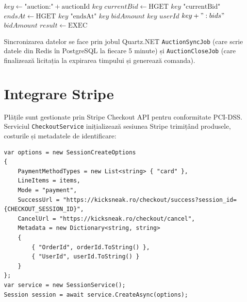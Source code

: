\begin{algorithm}[htbp]
\DontPrintSemicolon
\SetAlgoLined
{}
\BlankLine
$key \leftarrow \text{"auction:"} + \text{auctionId}$\;
 $key$\;
$currentBid \leftarrow \text{HGET } key \text{ "currentBid"}$\;
$endsAt \leftarrow \text{HGET } key \text{ "endsAt"}$\;
\;
 $key$  $bidAmount$\;
 $key$  $userId$\;
 $key + ":bids"$ $bidAmount$\;
$result \leftarrow \text{EXEC}$\;
  \;
\;
\;
\caption{Algoritmul de plasare bid cu control optimist al concurenței în Redis}
\label{alg:place_bid}
\end{algorithm}

Sincronizarea datelor se face prin jobul Quartz.NET \texttt{AuctionSyncJob} (care scrie datele din Redis în PostgreSQL la fiecare 5 minute) și \texttt{AuctionCloseJob} (care finalizează licitația la expirarea timpului și generează comanda).

\section{Integrare Stripe}

Plățile sunt gestionate prin Stripe Checkout API pentru conformitate PCI-DSS. Serviciul \texttt{CheckoutService} inițializează sesiunea Stripe trimițând produsele, costurile și metadatele de identificare:
\begin{lstlisting}[language={[sharp]C}]
var options = new SessionCreateOptions
{
    PaymentMethodTypes = new List<string> { "card" },
    LineItems = items,
    Mode = "payment",
    SuccessUrl = "https://kicksneak.ro/checkout/success?session_id={CHECKOUT_SESSION_ID}",
    CancelUrl = "https://kicksneak.ro/checkout/cancel",
    Metadata = new Dictionary<string, string>
    {
        { "OrderId", orderId.ToString() },
        { "UserId", userId.ToString() }
    }
};
var service = new SessionService();
Session session = await service.CreateAsync(options);
\end{lstlisting}

